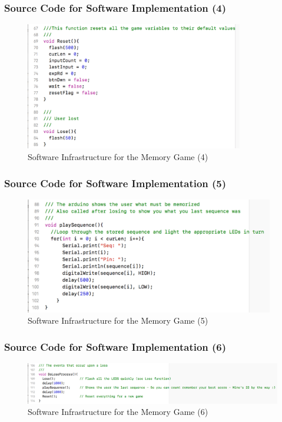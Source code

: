 \documentclass[xcolor={usenames,dvipsnames},hyperref={hyperindex,bookmarks}]{beamer}
\begin{document}
\frame
{
	\frametitle{Source Code for Software Implementation (4)}

\begin{figure}[h]
\centering 
\includegraphics[height=2.2in]{./pics/sw-infrastructure3}
\caption{Software Infrastructure for the Memory Game (4)}
\label{fig:swinfrastructure3}
\end{figure}
}


\frame
{
	\frametitle{Source Code for Software Implementation (5)}

\begin{figure}[h]
\centering 
\includegraphics[height=2.0in]{./pics/sw-infrastructure4}
\caption{Software Infrastructure for the Memory Game (5)}
\label{fig:swinfrastructure4}
\end{figure}
}



\frame
{
	\frametitle{Source Code for Software Implementation (6)}

\begin{figure}[h]
\centering 
\includegraphics[height=0.7 in]{./pics/sw-infrastructure5}
\caption{Software Infrastructure for the Memory Game (6)}
\label{fig:swinfrastructure5}
\end{figure}
}
\end{document}
